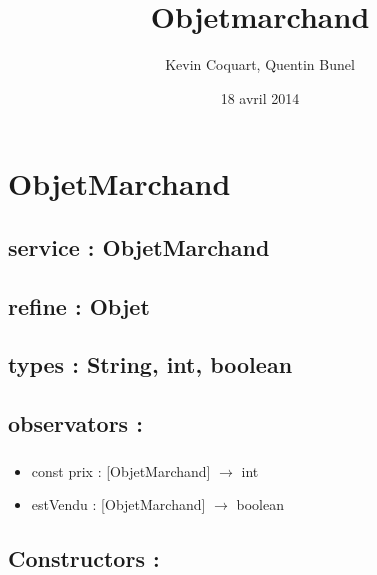 \documentclass[11pt]{article}
\title{Objetmarchand}
\author{Kevin Coquart, Quentin Bunel}
\date{18 avril 2014}
\begin{document}
\maketitle

\setcounter{tocdepth}{3}
\tableofcontents
\vspace*{1cm}
\section{ObjetMarchand}
\label{sec-1}

\subsection{service : ObjetMarchand}
\label{sec-1.1}

\subsection{refine : Objet}
\label{sec-1.2}

\subsection{types : String, int, boolean}
\label{sec-1.3}



\subsection{observators :}
\label{sec-1.4}

\subsubsection{}

\begin{itemize}

\item const prix : [ObjetMarchand] $\to$ int\\
\label{sec-1.4.1.1}


\item estVendu : [ObjetMarchand] $\to$ boolean\\
\label{sec-1.4.1.2}



\end{itemize} %
\subsection{Constructors :}
\label{sec-1.5}
\end{document}
